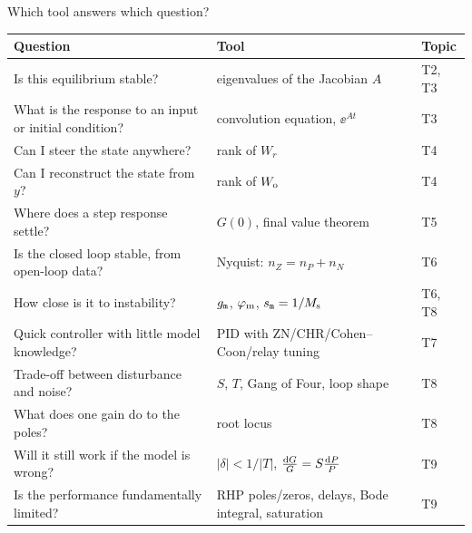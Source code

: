 \documentclass[10pt]{beamer-control}
\begin{document}
\begin{frame}{Which tool answers which question?}
  \begin{center}
    \scriptsize
    \renewcommand\arraystretch{1.35}
    \begin{tabular}{@{}p{4.6cm}p{4.9cm}l@{}}
      \toprule
      \textbf{Question} & \textbf{Tool} & \textbf{Topic}\\
      \midrule
      Is this equilibrium stable? & eigenvalues of the Jacobian $A$ & T2, T3\\
      What is the response to an input or initial condition? & convolution equation, $\ee^{At}$ & T3\\
      Can I steer the state anywhere? & rank of $W_r$ & T4\\
      Can I reconstruct the state from $y$? & rank of $W_{\mathrm{o}}$ & T4\\
      Where does a step response settle? & $G(0)$, final value theorem & T5\\
      Is the closed loop stable, from open-loop data? & Nyquist: $n_Z = n_P + n_N$ & T6\\
      How close is it to instability? & $g_{\texttt{m}}$, $\varphi_{\text{m}}$, $s_{\texttt{m}} = 1/M_{\text{s}}$ & T6, T8\\
      Quick controller with little model knowledge? & PID with ZN/CHR/Cohen--Coon/relay tuning & T7\\
      Trade-off between disturbance and noise? & $S$, $T$, Gang of Four, loop shape & T8\\
      What does one gain do to the poles? & root locus & T8\\
      Will it still work if the model is wrong? & $|\delta|<1/|T|$, $\frac{\mathrm{d} G}{G} = S\frac{\mathrm{d} P}{P}$ & T9\\
      Is the performance fundamentally limited? & RHP poles/zeros, delays, Bode integral, saturation & T9\\
      \bottomrule
    \end{tabular}
  \end{center}
\end{frame}
\end{document}
